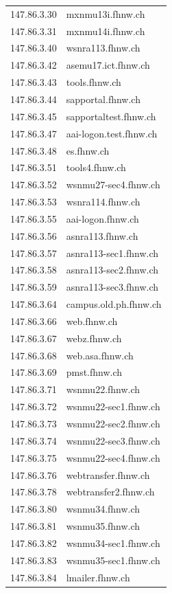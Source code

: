 \documentclass[a4paper,11pt]{scrartcl}
\begin{document}
\begin{longtable}{p{2.5cm}|p{7cm}}
	147.86.3.30 & mxnmu13i.fhnw.ch \\ 
	147.86.3.31 & mxnmu14i.fhnw.ch \\ 
	147.86.3.40 & wsnra113.fhnw.ch \\ 
	147.86.3.42 & asemu17.ict.fhnw.ch \\ 
	147.86.3.43 & tools.fhnw.ch \\ 
	147.86.3.44 & sapportal.fhnw.ch \\ 
	147.86.3.45 & sapportaltest.fhnw.ch \\ 
	147.86.3.47 & aai-logon.test.fhnw.ch \\ 
	147.86.3.48 & es.fhnw.ch \\ 
	147.86.3.51 & tools4.fhnw.ch \\ 
	147.86.3.52 & wsnmu27-sec4.fhnw.ch \\ 
	147.86.3.53 & wsnra114.fhnw.ch \\ 
	147.86.3.55 & aai-logon.fhnw.ch \\ 
	147.86.3.56 & asnra113.fhnw.ch \\ 
	147.86.3.57 & asnra113-sec1.fhnw.ch \\ 
	147.86.3.58 & asnra113-sec2.fhnw.ch \\ 
	147.86.3.59 & asnra113-sec3.fhnw.ch \\ 
	147.86.3.64 & campus.old.ph.fhnw.ch \\ 
	147.86.3.66 & web.fhnw.ch \\ 
	147.86.3.67 & webz.fhnw.ch \\ 
	147.86.3.68 & web.asa.fhnw.ch \\ 
	147.86.3.69 & pmst.fhnw.ch \\ 
	147.86.3.71 & wsnmu22.fhnw.ch \\ 
	147.86.3.72 & wsnmu22-sec1.fhnw.ch \\ 
	147.86.3.73 & wsnmu22-sec2.fhnw.ch \\ 
	147.86.3.74 & wsnmu22-sec3.fhnw.ch \\ 
	147.86.3.75 & wsnmu22-sec4.fhnw.ch \\ 
	147.86.3.76 & webtransfer.fhnw.ch \\ 
	147.86.3.78 & webtransfer2.fhnw.ch \\ 
	147.86.3.80 & wsnmu34.fhnw.ch \\ 
	147.86.3.81 & wsnmu35.fhnw.ch \\ 
	147.86.3.82 & wsnmu34-sec1.fhnw.ch \\ 
	147.86.3.83 & wsnmu35-sec1.fhnw.ch \\ 
	147.86.3.84 & lmailer.fhnw.ch \\ 

\end{longtable}
\end{document}
